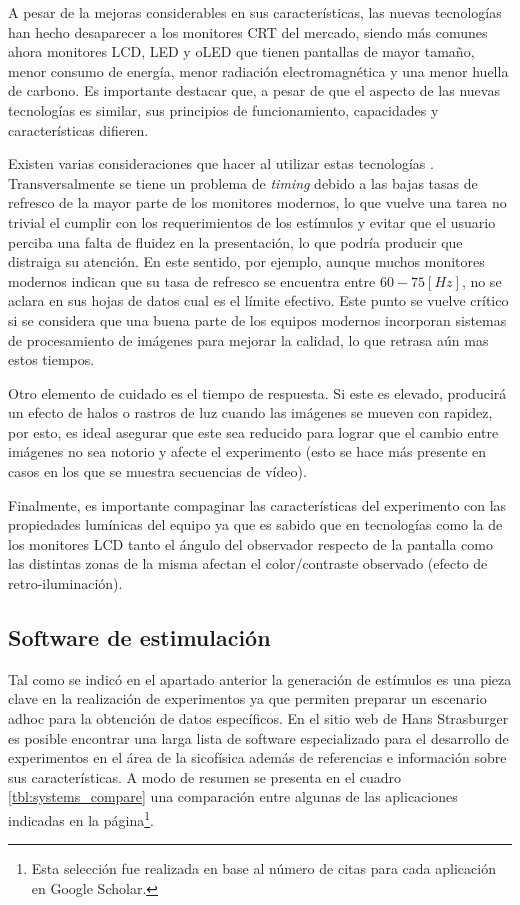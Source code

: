 \documentclass[../Main.tex]{subfiles}
\begin{document}
			A pesar de la mejoras considerables en sus características, las nuevas tecnologías han hecho desaparecer a los monitores CRT del mercado, siendo más comunes ahora monitores LCD, LED y oLED que tienen pantallas de mayor tamaño, menor consumo de energía, menor radiación electromagnética y una menor huella de carbono. Es importante destacar que, a pesar de que el aspecto de las nuevas tecnologías es similar, sus principios de funcionamiento, capacidades y características difieren.

			Existen varias consideraciones que hacer al utilizar estas tecnologías \cite{article:monitor_wang, article:monitor_elze}. Transversalmente se tiene un problema de \textit{timing} debido a las bajas tasas de refresco de la mayor parte de los monitores modernos, lo que vuelve una tarea no trivial el cumplir con los requerimientos de los estímulos y evitar que el usuario perciba una falta de fluidez en la presentación, lo que podría producir que distraiga su atención. En este sentido, por ejemplo, aunque muchos monitores modernos indican que su tasa de refresco se encuentra entre $60-75[Hz]$, no se aclara en sus hojas de datos cual es el límite efectivo. Este punto se vuelve crítico si se considera que una buena parte de los equipos modernos incorporan sistemas de procesamiento de imágenes para mejorar la calidad, lo que retrasa aún mas estos tiempos. 

			Otro elemento de cuidado es el tiempo de respuesta. Si este es elevado, producirá un efecto de halos o rastros de luz cuando las imágenes se mueven con rapidez, por esto, es ideal asegurar que este sea reducido para lograr que el cambio entre imágenes no sea notorio y afecte el experimento (esto se hace más presente en casos en los que se muestra secuencias de vídeo). 

			Finalmente, es importante compaginar las características del experimento con las propiedades lumínicas del equipo ya que es sabido que en tecnologías como la de los monitores LCD tanto el ángulo del observador respecto de la pantalla como las distintas zonas de la misma afectan el color/contraste observado (efecto de retro-iluminación). 
			
		\subsection{Software de estimulación}
		\label{sub:02_software_de_estimulacion}

			Tal como se indicó en el apartado anterior la generación de estímulos es una pieza clave en la realización de experimentos ya que permiten preparar un escenario adhoc para la obtención de datos específicos. En el sitio web de Hans Strasburger \cite{website:software} es posible encontrar una larga lista de software especializado para el desarrollo de experimentos en el área de la sicofísica además de referencias e información sobre sus características. A modo de resumen se presenta en el cuadro \ref{tbl:systems_compare} una comparación entre algunas de las aplicaciones indicadas en la página\footnote{Esta selección fue realizada en base al número de citas para cada aplicación en Google Scholar.}.  
			
\end{document}
